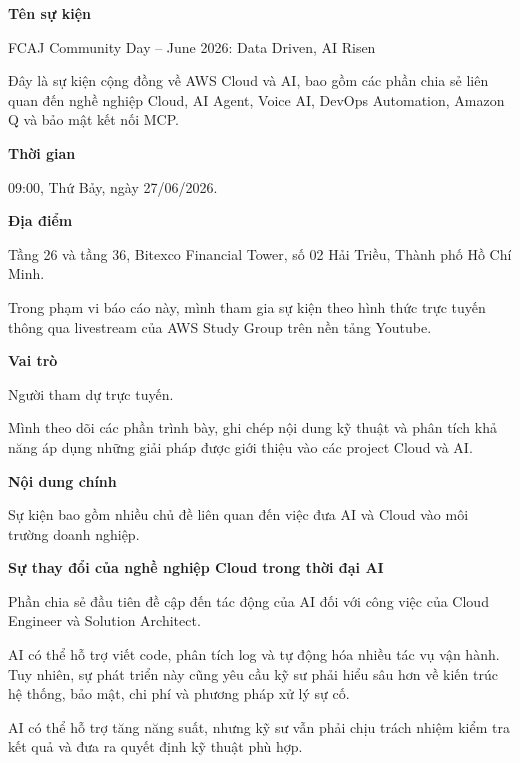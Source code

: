 \vspace{0.5em}\noindent\textbf{Tên sự kiện}\par

FCAJ Community Day -- June 2026: Data Driven, AI Risen

Đây là sự kiện cộng đồng về AWS Cloud và AI, bao gồm các phần chia sẻ
liên quan đến nghề nghiệp Cloud, AI Agent, Voice AI, DevOps Automation,
Amazon Q và bảo mật kết nối MCP.

\vspace{0.5em}\noindent\textbf{Thời gian}\par

09:00, Thứ Bảy, ngày 27/06/2026.

\vspace{0.5em}\noindent\textbf{Địa điểm}\par

Tầng 26 và tầng 36, Bitexco Financial Tower, số 02 Hải Triều, Thành phố
Hồ Chí Minh.

Trong phạm vi báo cáo này, mình tham gia sự kiện theo hình thức trực
tuyến thông qua livestream của AWS Study Group trên nền tảng Youtube.

\vspace{0.5em}\noindent\textbf{Vai trò}\par

Người tham dự trực tuyến.

Mình theo dõi các phần trình bày, ghi chép nội dung kỹ thuật và phân
tích khả năng áp dụng những giải pháp được giới thiệu vào các project
Cloud và AI.

\vspace{0.5em}\noindent\textbf{Nội dung chính}\par

Sự kiện bao gồm nhiều chủ đề liên quan đến việc đưa AI và Cloud vào môi
trường doanh nghiệp.

\vspace{0.5em}\noindent\textbf{Sự thay đổi của nghề nghiệp Cloud trong thời đại
AI}\par

Phần chia sẻ đầu tiên đề cập đến tác động của AI đối với công việc của
Cloud Engineer và Solution Architect.

AI có thể hỗ trợ viết code, phân tích log và tự động hóa nhiều tác vụ
vận hành. Tuy nhiên, sự phát triển này cũng yêu cầu kỹ sư phải hiểu sâu
hơn về kiến trúc hệ thống, bảo mật, chi phí và phương pháp xử lý sự cố.

AI có thể hỗ trợ tăng năng suất, nhưng kỹ sư vẫn phải chịu trách nhiệm
kiểm tra kết quả và đưa ra quyết định kỹ thuật phù hợp.

